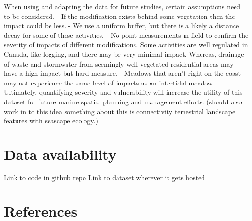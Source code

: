 \documentclass[12pt]{article}\usepackage[]{graphicx}\usepackage[]{color}
\begin{document}
When using and adapting the data for future studies, certain assumptions need to be considered. - If the modification exists behind some vegetation then the impact could be less. - We use a uniform buffer, but there is a likely a distance decay for some of these activities. - No point measurements in field to confirm the severity of impacts of different modifications. Some activities are well regulated in Canada, like logging, and there may be very minimal impact. Whereas, drainage of waste and stormwater from seemingly well vegetated residential areas may have a high impact but hard measure. - Meadows that aren't right on the coast may not experience the same level of impacts as an intertidal meadow. - Ultimately, quantifying severity and vulnerability will increase the utility of this dataset for future marine spatial planning and management efforts. (should also work in to this idea something about this is connectivity terrestrial landscape features with seascape ecology.)

\hypertarget{data-availability}{%
\section{Data availability}\label{data-availability}}

Link to code in github repo Link to dataset wherever it gets hosted

\clearpage

\hypertarget{references}{%
\section{References}\label{references}}

\noindent \vspace{-2em} \setlength{\parindent}{-0.2in} \setlength{\leftskip}{0.2in} \setlength{\parskip}{8pt}
\end{document}
